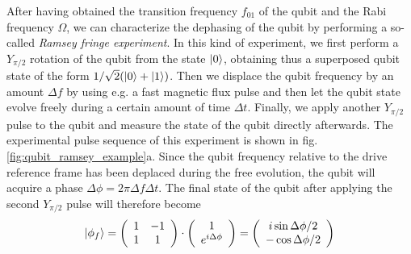 After having obtained the transition frequency $f_{01}$ of the qubit and the Rabi frequency $\Omega$, we can characterize the dephasing of the qubit by performing a so-called {\it Ramsey fringe experiment}. In this kind of experiment, we first perform a $Y_{\pi/2}$ rotation of the qubit from the state $\left| 0 \right>$, obtaining thus a superposed qubit state of the form $1/\sqrt{2}(\left| 0 \right>+\left| 1 \right>)$. Then we displace the qubit frequency by an amount $\Delta f$ by using e.g. a fast magnetic flux pulse and then let the qubit state evolve freely during a certain amount of time $\Delta t$. Finally, we apply another $Y_{\pi/2}$ pulse to the qubit and measure the state of the qubit directly afterwards. The experimental pulse sequence of this experiment is shown in fig. \ref{fig:qubit_ramsey_example}a. Since the qubit frequency relative to the drive reference frame has been deplaced during the free evolution, the qubit will acquire a phase $\Delta \phi = 2\pi\Delta f \Delta t$. The final state of the qubit after applying the second $Y_{\pi/2}$ pulse will therefore become
%
\begin{equation}
\left| \phi_f \right> = \left(\begin{array}{cc} 1 & -1 \\ 1 & 1 \end{array} \right)\cdot\left(\begin{array}{c} 1 \\ e^{i\Delta\phi} \end{array}\right) = \left( \begin{array}{c} i\sin{\Delta\phi/2} \\ -\cos{\Delta\phi/2}\end{array}\right)
\end{equation}
%

